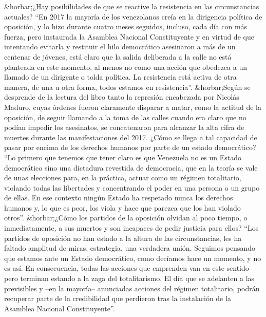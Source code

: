 \documentclass{article}%
\begin{document}
\newline%
%
\&horbar;¿Hay posibilidades de que se reactive la resistencia en las circunstancias actuales?%
\newline%
%
“En 2017 la mayoría de los venezolanos creía en la dirigencia política de oposición, y lo hizo durante cuatro meses seguidos, incluso, cada día con más fuerza, pero instaurada la Asamblea Nacional Constituyente y en virtud de que intentando evitarla y restituir el hilo democrático asesinaron a más de un centenar de jóvenes, está claro que la salida deliberada a la calle no está planteada en este momento, al menos no como una acción que obedezca a un llamado de un dirigente o tolda política. La resistencia está activa de otra manera, de una u otra forma, todos estamos en resistencia”.%
\newline%
%
\&horbar;Según se desprende de la lectura del libro tanto la represión encabezada por Nicolás Maduro, cuyas órdenes fueron claramente disparar a matar, como la actitud de la oposición, de seguir llamando a la toma de las calles cuando era claro que no podían impedir los asesinatos, se concatenaron para alcanzar la alta cifra de muertes durante las manifestaciones del 2017. ¿Cómo se llega a tal capacidad de pasar por encima de los derechos humanos por parte de un estado democrático?%
\newline%
%
“Lo primero que tenemos que tener claro es que Venezuela no es un Estado democrático sino una dictadura revestida de democracia, que en la teoría se vale de unas elecciones para, en la práctica, actuar como un régimen totalitario, violando todas las libertades y concentrando el poder en una persona o un grupo de ellas. En ese contexto ningún Estado ha respetado nunca los derechos humanos y, lo que es peor, los viola y hace que parezca que los han violado otros”.%
\newline%
%
\&horbar;¿Cómo los partidos de la oposición olvidan al poco tiempo, o inmediatamente, a sus muertos y son incapaces de pedir justicia para ellos?%
\newline%
%
“Los partidos de oposición no han estado a la altura de las circunstancias, les ha faltado amplitud de miras, estrategia, una verdadera unión. Seguimos pensando que estamos ante un Estado democrático, como decíamos hace un momento, y no es así. En consecuencia, todas las acciones que emprenden van en este sentido pero terminan estando a la zaga del totalitarismo. El día que se adelanten a las previsibles y –en la mayoría– anunciadas acciones del régimen totalitario, podrán recuperar parte de la credibilidad que perdieron tras la instalación de la Asamblea Nacional Constituyente”.%
\end{document}

